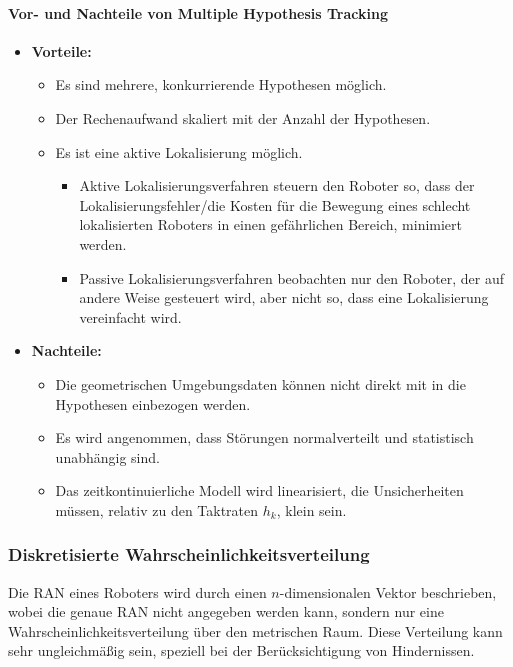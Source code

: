 				\paragraph{Vor- und Nachteile von Multiple Hypothesis Tracking}
					\begin{itemize}
						\item \textbf{Vorteile:}
							\begin{itemize}
								\item Es sind mehrere, konkurrierende Hypothesen möglich.
								\item Der Rechenaufwand skaliert mit der Anzahl der Hypothesen.
								\item Es ist eine aktive Lokalisierung möglich.
									\begin{itemize}
										\item Aktive Lokalisierungsverfahren steuern den Roboter so, dass der Lokalisierungsfehler/die Kosten für die Bewegung eines schlecht lokalisierten Roboters in einen gefährlichen Bereich, minimiert werden.
										\item Passive Lokalisierungsverfahren beobachten nur den Roboter, der auf andere Weise gesteuert wird, aber nicht so, dass eine Lokalisierung vereinfacht wird.
									\end{itemize}
							\end{itemize}
						\item \textbf{Nachteile:}
							\begin{itemize}
								\item Die geometrischen Umgebungsdaten können nicht direkt mit in die Hypothesen einbezogen werden.
								\item Es wird angenommen, dass Störungen normalverteilt und statistisch unabhängig sind.
								\item Das zeitkontinuierliche Modell wird linearisiert, \dh die Unsicherheiten müssen, relativ zu den Taktraten \( h_k \), klein sein.
							\end{itemize}
					\end{itemize}

			\subsubsection{Diskretisierte Wahrscheinlichkeitsverteilung}
				Die RAN eines Roboters wird durch einen \(n\)-dimensionalen Vektor beschrieben, wobei die genaue RAN nicht angegeben werden kann, sondern nur eine Wahrscheinlichkeitsverteilung über den metrischen Raum. Diese Verteilung kann sehr ungleichmäßig sein, speziell bei der Berücksichtigung von Hindernissen.

